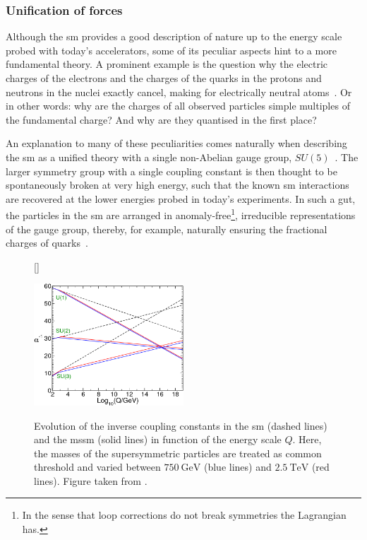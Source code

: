 \subsubsection{Unification of forces}


Although the \gls{sm} provides a good description of nature up to the energy scale probed with today's accelerators, some of its peculiar aspects hint to a more fundamental theory. A prominent example is the question why the electric charges of the electrons and the charges of the quarks in the protons and neutrons in the nuclei exactly cancel, making for electrically neutral atoms~\cite{Brock:1354959}. Or in other words: why are the charges of all observed particles simple multiples of the fundamental charge? And why are they quantised in the first place?

An explanation to many of these peculiarities comes naturally when describing the \gls{sm} as a unified theory with a single non-Abelian gauge group, \eg $SU(5)$~\cite{PhysRevLett.32.438}. The larger symmetry group with a single coupling constant is then thought to be spontaneously broken at very high energy, such that the known \gls{sm} interactions are recovered at the lower energies probed in today's experiments. In such a \gls{gut}, the particles in the \gls{sm} are arranged in anomaly-free\footnote{In the sense that loop corrections do not break symmetries the Lagrangian has.}, irreducible representations of the gauge group, thereby, for example, naturally ensuring the fractional charges of quarks~\cite{Peskin:1995ev}.

\begin{figure}
[\FBwidth]
{\caption{Evolution of the inverse coupling constants in the \gls{sm} (dashed lines) and the \gls{mssm} (solid lines) in function of the energy scale $Q$. Here, the masses of the supersymmetric particles are treated as common threshold and varied between $\SI{750}{\GeV}$ (blue lines) and $\SI{2.5}{\TeV}$ (red lines). Figure taken from \cite{Martin:1997ns}.}\label{fig:unification_forces}}
{\includegraphics[width=0.5\textwidth]{unification}}
\end{figure}

